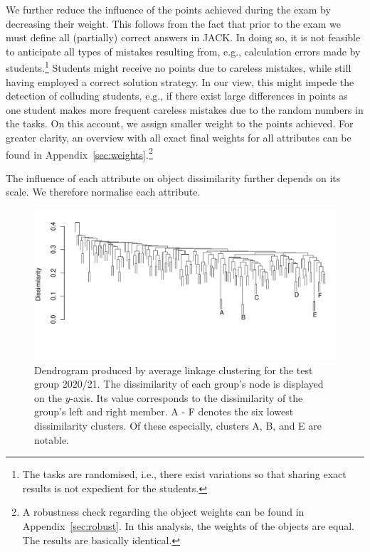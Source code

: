 \documentclass{edm_article}
\begin{document}
We further reduce the influence of the points achieved during the exam by decreasing their weight. This follows from the fact that prior to the exam we must define all (partially) correct answers in JACK. In doing so, it is not feasible to anticipate all types of mistakes resulting from, e.g., calculation errors made by students.\footnote{The tasks are randomised, i.e., there exist variations so that sharing exact results is not expedient for the students.} Students might receive no points due to careless mistakes, while still having employed a correct solution strategy. In our view, this might impede the detection of colluding students, e.g., if there exist large differences in points as one student makes more frequent careless mistakes due to the random numbers in the tasks. On this account, we assign smaller weight to the points achieved. For greater clarity, an overview with all exact final weights for all attributes can be found in Appendix~\ref{sec:weights}.\footnote{A robustness check regarding the object weights can be found in Appendix~\ref{sec:robust}. In this analysis, the weights of the objects are equal. The results are basically identical.} 

The influence of each attribute on object dissimilarity further depends on its scale. We therefore normalise each attribute.

\begin{figure}
\includegraphics[width = \textwidth]{dendro_anon_av_02.pdf}
\caption{Dendrogram produced by average linkage clustering for the test group 2020/21. The dissimilarity of each group's node is displayed on the $y$-axis. Its value corresponds to the dissimilarity of the group's left and right member. A - F denotes the six lowest dissimilarity clusters. Of these especially, clusters A, B, and E are notable.}
\label{fig:tree_cl}
\end{figure}
\end{document}
